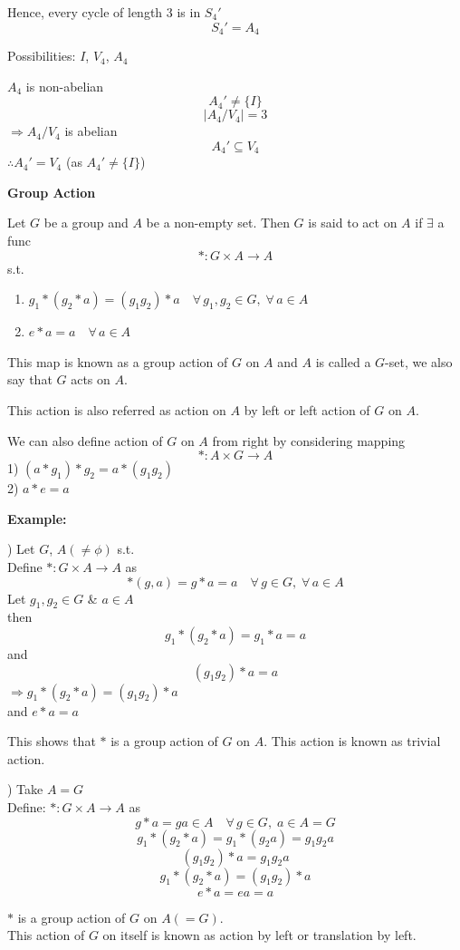 \documentclass[11pt]{article}
\begin{document}
Hence, every cycle of length 3 is in $S_4'$
\[
S_4' = A_4
\]

Possibilities: $I$, $V_4$, $A_4$

$A_4$ is non-abelian
\[
A_4' \ne \{I\}
\]
\[
|A_4 / V_4| = 3
\]
$\Rightarrow A_4 / V_4$ is abelian
\[
A_4' \subseteq V_4
\]
$\therefore A_4' = V_4$ (as $A_4' \ne \{I\}$)

\bigskip
\noindent \textbf{Group Action}

\noindent Let $G$ be a group and $A$ be a non-empty set. Then $G$ is said to act on $A$ if $\exists$ a func
\[
* : G \times A \longrightarrow A
\]
s.t.
\begin{enumerate}
    \item $g_1 * (g_2 * a) = (g_1 g_2) * a \quad \forall\, g_1, g_2 \in G, \; \forall\, a \in A$
    \item $e * a = a \quad \forall\, a \in A$
\end{enumerate}
This map is known as a group action of $G$ on $A$ and $A$ is called a $G$-set, we also say that $G$ acts on $A$.

This action is also referred as action on $A$ by left or left action of $G$ on $A$.

We can also define action of $G$ on $A$ from right by considering mapping
\[
* : A \times G \longrightarrow A
\]
1) $(a * g_1) * g_2 = a * (g_1 g_2)$ \\
2) $a * e = a$

\bigskip
\noindent \textbf{Example:}

) Let $G$, $A (\ne \phi)$ s.t. \\
Define $* : G \times A \to A$ as
\[
*(g, a) = g * a = a \quad \forall\, g \in G, \; \forall\, a \in A
\]
Let $g_1, g_2 \in G$ \& $a \in A$ \\
then
\[
g_1 * (g_2 * a) = g_1 * a = a
\]
and
\[
(g_1 g_2) * a = a
\]
$\Rightarrow g_1 * (g_2 * a) = (g_1 g_2) * a$ \\
and $e * a = a$

This shows that $*$ is a group action of $G$ on $A$. This action is known as trivial action.

\bigskip
{}) Take $A = G$ \\
Define: $* : G \times A \to A$ as
\[
g * a = ga \in A \quad \forall\, g \in G, \; a \in A = G
\]
\[
g_1 * (g_2 * a) = g_1 * (g_2 a) = g_1 g_2 a
\]
\[
(g_1 g_2) * a = g_1 g_2 a
\]
\[
g_1 * (g_2 * a) = (g_1 g_2) * a
\]
\[
e * a = ea = a
\]

\newpage
$*$ is a group action of $G$ on $A (= G)$. \\
This action of $G$ on itself is known as action by left or translation by left.
\end{document}
